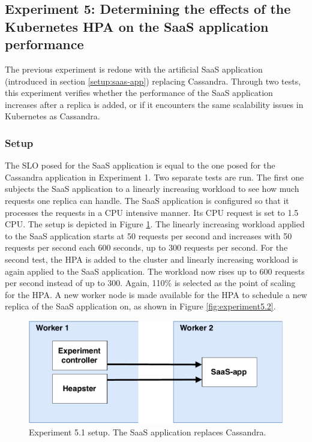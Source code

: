 \subsection{Experiment 5: Determining the effects of the Kubernetes HPA on the SaaS application performance}
The previous experiment is redone with the artificial SaaS application (introduced in section \ref{setup:saas-app}) replacing Cassandra. Through two tests, this experiment verifies whether the performance of the SaaS application increases after a replica is added, or if it encounters the same scalability issues in Kubernetes as Cassandra.  

\subsubsection{Setup}
The SLO posed for the SaaS application is equal to the one posed for the Cassandra application in Experiment 1. Two separate tests are run. The first one subjects the SaaS application to a linearly increasing workload to see how much requests one replica can handle. The SaaS application is configured so that it processes the requests in a CPU intensive manner. Its CPU request is set to 1.5 CPU. The setup is depicted in Figure \ref{fig:experiment5.1}. The linearly increasing workload applied to the SaaS application starts at 50 requests per second and increases with 50 requests per second each 600 seconds, up to 300 requests per second. For the second test, the HPA is added to the cluster and linearly increasing workload is again applied to the SaaS application. The workload now rises up to 600 requests per second instead of up to 300. Again, 110\% is selected as the point of scaling for the HPA. A new worker node is made available for the HPA to schedule a new replica of the SaaS application on, as shown in Figure \ref{fig:experiment5.2}. 

\begin{figure}
\centering
\includegraphics[width=0.55\columnwidth]{Images/Experiments/Experiment_1_SaaS.pdf}
\caption{Experiment 5.1 setup. The SaaS application replaces Cassandra.}
\label{fig:experiment5.1}
\end{figure}

